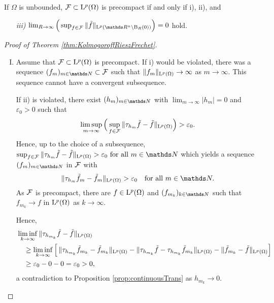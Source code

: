 \begin{rem}
  If $\Omega$ is unbounded, $\mathcal{F} \subset \mathrm{L}^p(\Omega)$ is precompact if and only if i), ii), and
  \begin{enumerate}
    \item[\textit{iii)}] $
  \lim_{R \to \infty} \Big( \sup_{f \in \FF} \|\tilde f\|_{\Ell^p(\R^n \setminus \BB_R(0))} \Big) = 0$ hold.
  \end{enumerate}
\end{rem}

\begin{proof}[Proof of Theorem \ref{thm:KolmogoroffRieszFrechet}]
  \begin{enumerate}[I)]
    \item Assume that $\mathcal{F} \subset \mathrm{L}^p(\Omega)$ is precompact.
      If i) would be violated, there was a sequence $(f_m)_{m \in\N} \subset \FF$ such that $\|f_m\|_{\mathrm{L}^p(\Omega)} \to \infty$ as $m \to \infty$. This sequence cannot have a convergent subsequence. 

      If ii) is violated, there exist $(h_m)_{m \in \N}$ with $\lim_{m \to \infty} |h_m| = 0$ and $\varepsilon_0  > 0$ such that 
      $$
      \limsup_{m \to \infty} \Big( \sup_{f \in \mathcal{F}} \| \tau_{h_m} \tilde f - \tilde f \|_{\mathrm{L}^p(\Omega)}\Big) > \varepsilon_0.
      $$
      Hence, up to the choice of a subsequence, 
      $
      \sup_{f \in \FF} \| \tau_{h_{m}} \tilde f - \tilde f \|_{\Ell^p(\Omega)} > \varepsilon_0 \text{ for all } m \in \N
      $
      which yields a sequence $(f_m)_{m \in \N}$ in $\mathcal{F}$ with
      $$
      \|\tau_{h_{m}} \tilde f_m - \tilde f_m \|_{\Ell^p(\Omega)} > \varepsilon_0 \quad\text{for all } m \in \N.
      $$
      As $\mathcal{F}$ is precompact, there are $f \in \mathrm{L}^p(\Omega)$ and $(f_{m_k})_{k \in \N}$ such that $f_{m_k} \to f$ in $\mathrm{L}^p(\Omega)$ as $k \to \infty$.

      Hence,
      \begin{align*}
        &\liminf_{k \to \infty} \| \tau_{h_{m_k}} \tilde f - \tilde f \|_{\mathrm{L}^p(\Omega)} \\
        &\quad 
        \geq \liminf_{k \to \infty} \Big[\, \|\tau_{h_{m_k}} \tilde f_{m_k} - \tilde f_{m_k}\|_{\mathrm{L}^p(\Omega)} - \|\tau_{h_{m_k}} \tilde f - \tau_{h_{m_k}} \tilde f_{m_k} \|_{\mathrm{L}^p(\Omega)} - \|\tilde f_{m_k} - \tilde f \|_{\mathrm{L}^p(\Omega)} \Big] \\
        &\quad
        \geq \varepsilon_0 - 0 - 0 = \varepsilon_0 > 0,
      \end{align*}
      a contradiction to Proposition \ref{prop:continuousTrans} as $h_{m_k} \to 0$.


\end{enumerate}
\end{proof}
